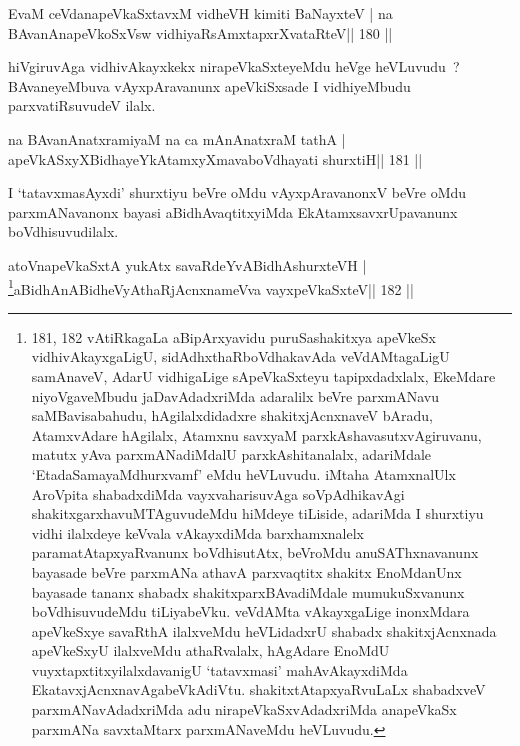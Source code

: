 \begin{shl}
EvaM ceVdanapeVkaSxtavxM vidheVH kimiti BaNayxteV |
na BAvanAnapeVkoSxV\s sw vidhiyaRsAmxtapxrXvataRteV\hfill || 180 ||
\end{shl}

\begin{artha}
hiVgiruvAga vidhivAkayxkekx nirapeVkaSxteyeMdu heVge heVLuvudu~? BAvaneyeMbuva vAyxpAravanunx apeVkiSxsade I vidhiyeMbudu parxvatiRsuvudeV ilalx.
\end{artha}

\begin{shl}
na BAvanAnatxramiyaM na ca mAnAnatxraM tathA |
apeVkASxyXBidhayeYkAtamxyXmavaboVdhayati shurxtiH\hfill || 181 ||
\end{shl}

\begin{artha}
I `tatavxmasAyxdi' shurxtiyu beVre oMdu vAyxpAravanonxV beVre oMdu parxmANavanonx bayasi aBidhAvaqtitxyiMda EkAtamxsavxrUpavanunx boVdhisuvudilalx.
\end{artha}

\begin{shl}
atoV\s napeVkaSxtA yukAtx savaRdeYvABidhAshurxteVH |
\footnote{181, 182 vAtiRkagaLa aBipArxyavidu \mdash puruSashakitxya apeVkeSx \ndash vidhivAkayxgaLigU, sidAdhxthaRboVdhakavAda veVdAMtagaLigU samAnaveV, AdarU vidhigaLige sApeVkaSxteyu tapipxdadxlalx, EkeMdare niyoVgaveMbudu jaDavAdadxriMda adaralilx beVre parxmANavu saMBavisabahudu, hAgilalxdidadxre shakitxjAcnxnaveV bAradu, AtamxvAdare hAgilalx, Atamxnu savxyaM parxkAshavasutxvAgiruvanu, matutx yAva parxmANadiMdalU parxkAshitanalalx, adariMdale `EtadaSamayaMdhurxvamf' eMdu heVLuvudu. iMtaha AtamxnalUlx AroVpita shabadxdiMda vayxvaharisuvAga soVpAdhikavAgi shakitxgarxhavuMTAguvudeMdu hiMdeye tiLiside, adariMda I shurxtiyu vidhi ilalxdeye keVvala vAkayxdiMda barxhamxnalelx paramatAtapxyaRvanunx boVdhisutAtx, beVroMdu anuSAThxnavanunx bayasade beVre parxmANa athavA parxvaqtitx shakitx EnoMdanUnx bayasade tananx shabadx shakitxparxBAvadiMdale mumukuSxvanunx boVdhisuvudeMdu tiLiyabeVku. veVdAMta vAkayxgaLige inonxMdara apeVkeSxye savaRthA ilalxveMdu heVLidadxrU shabadx shakitxjAcnxnada apeVkeSxyU ilalxveMdu athaRvalalx, hAgAdare EnoMdU vuyxtapxtitxyilalxdavanigU `tatavxmasi' mahAvAkayxdiMda EkatavxjAcnxnavAgabeVkAdiVtu. shakitxtAtapxyaRvuLaLx shabadxveV parxmANavAdadxriMda adu nirapeVkaSxvAdadxriMda anapeVkaSx parxmANa savxtaMtarx parxmANaveMdu heVLuvudu.}aBidhAnABidheVyAthaRjAcnxnameVva vayxpeVkaSxteV\hfill || 182 ||
\end{shl}

